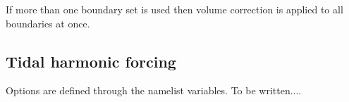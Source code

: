 If more than one boundary set is used then volume correction is
applied to all boundaries at once.

\newpage
\subsection{Tidal harmonic forcing}
\label{BDY_tides}


Options are defined through the   namelist variables.
 To be written....




